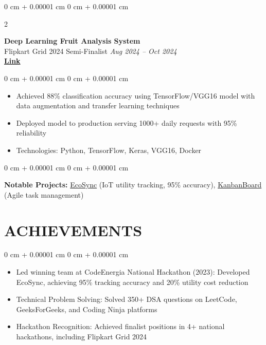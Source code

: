 \documentclass[10pt, a4paper]{article}
\newcommand{\semibold}[1]{{\fontseries{sb}\selectfont #1}}
\newenvironment{highlights}{
    \begin{itemize}[
        topsep=0.10 cm,
        parsep=0.10 cm,
        partopsep=0pt,
        itemsep=0pt,
        leftmargin=0 cm + 10pt
    ]
}{
    \end{itemize}
}
\newenvironment{onecolentry}{
    \begin{adjustwidth}{
        0 cm + 0.00001 cm
    }{
        0 cm + 0.00001 cm
    }
}{
    \end{adjustwidth}
}
\newenvironment{twocolentry}[2][]{
    \onecolentry
    \def\secondColumn{#2}
    \setcolumnwidth{\fill, 4.5 cm}
    \begin{paracol}{2}
}{
    \switchcolumn \raggedleft \secondColumn
    \end{paracol}
    \endonecolentry
}
\begin{document}
\begin{twocolentry}{
   \textit{Aug 2024 – Oct 2024} \\
   \href{https://github.com/harshsingh-io/fruit_freshness_analysis}{\textbf{\textcolor{highlightColor}{Link}}}
}
   \textbf{Deep Learning Fruit Analysis System} \\
   \semibold{Flipkart Grid 2024 Semi-Finalist}\end{twocolentry}

\vspace{0.10 cm}
\begin{onecolentry}
   \begin{highlights}
       \item \semibold{Achieved 88\% classification accuracy} using TensorFlow/VGG16 model with data augmentation and transfer learning techniques
       \item \semibold{Deployed} model to production serving 1000+ daily requests with 95\% reliability
       \item \semibold{Technologies:} Python, TensorFlow, Keras, VGG16, Docker
   \end{highlights}
\end{onecolentry}

\begin{onecolentry}
   \textbf{Notable Projects:} 
       \href{https://github.com/harshsingh-io/EcoSync}{\textcolor{highlightColor}{EcoSync}} (IoT utility tracking, 95\% accuracy),  
       \href{https://github.com/harshsingh-io/KanbanBoard}{\textcolor{highlightColor}{KanbanBoard}} (Agile task management)
\end{onecolentry}

\section{ACHIEVEMENTS}

\begin{onecolentry}
    \begin{highlights}
        \item \semibold{Led winning team at CodeEnergia National Hackathon (2023):} Developed EcoSync, achieving 95\% tracking accuracy and 20\% utility cost reduction
        \item \semibold{Technical Problem Solving:} Solved 350+ DSA questions on LeetCode, GeeksForGeeks, and Coding Ninja platforms
        \item \semibold{Hackathon Recognition:} Achieved finalist positions in 4+ national hackathons, including Flipkart Grid 2024
    \end{highlights}
\end{onecolentry}
\end{document}
